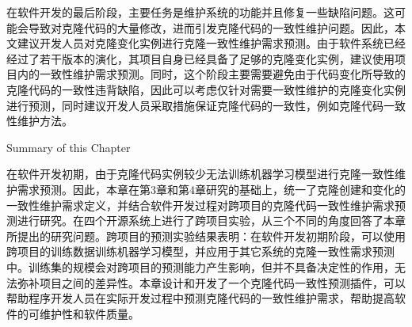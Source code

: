 在软件开发的最后阶段，主要任务是维护系统的功能并且修复一些缺陷问题。这可能会导致对克隆代码的大量修改，进而引发克隆代码的一致性维护问题。因此，本文建议开发人员对克隆变化实例进行克隆一致性维护需求预测。由于软件系统已经经过了若干版本的演化，其项目自身已经具备了足够的克隆变化实例，建议使用项目内的一致性维护需求预测。同时，这个阶段主要需要避免由于代码变化所导致的克隆代码的一致性违背缺陷，因此可以考虑仅针对需要一致性维护的克隆变化实例进行预测，同时建议开发人员采取措施保证克隆代码的一致性，例如克隆代码一致性维护方法\cite{cheng2016rule,nguyen2012clone}。


{Summary of this Chapter}

在软件开发初期，由于克隆代码实例较少无法训练机器学习模型进行克隆一致性维护需求预测。因此，本章在第3章和第4章研究的基础上，统一了克隆创建和变化的一致性维护需求定义，并结合软件开发过程对跨项目的克隆代码一致性维护需求预测进行研究。在四个开源系统上进行了跨项目实验，从三个不同的角度回答了本章所提出的研究问题。跨项目的预测实验结果表明：在软件开发初期阶段，可以使用跨项目的训练数据训练机器学习模型，并应用于其它系统的克隆一致性需求预测中。训练集的规模会对跨项目的预测能力产生影响，但并不具备决定性的作用，无法弥补项目之间的差异性。本章设计和开发了一个克隆代码一致性预测插件，可以帮助程序开发人员在实际开发过程中预测克隆代码的一致性维护需求，帮助提高软件的可维护性和软件质量。